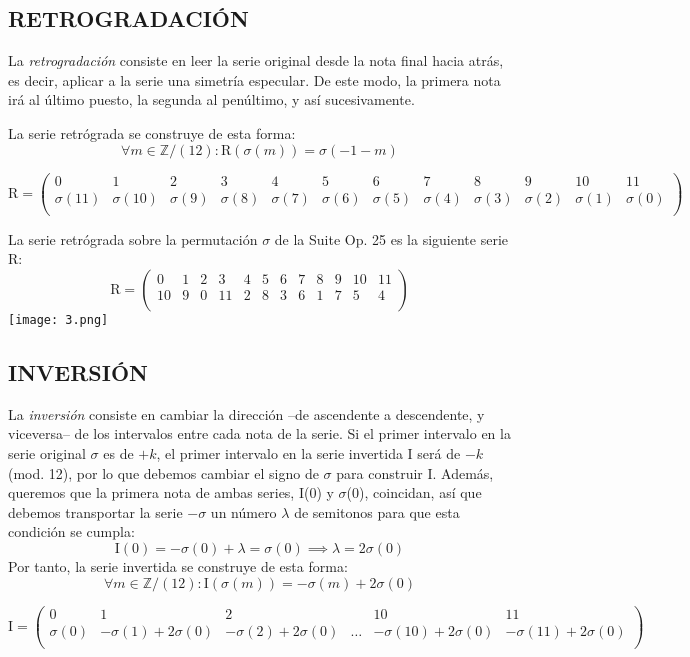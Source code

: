 	\subsection{RETROGRADACIÓN}
		La \emph{retrogradación} consiste en leer la serie original desde la nota final hacia atrás, es decir, aplicar a la serie una simetría especular. De este modo, la primera nota irá al último puesto, la segunda al penúltimo, y así sucesivamente.
		
		La serie retrógrada se construye de esta forma:
		$$
		\forall m\in \mathbb{Z} / (12):	\text{R}\left(\sigma\left(m\right)\right)=\sigma\left(-1-m\right)$$ \begin{footnotesize}$$			\text{R}=\left(\begin{matrix}0&1&2&3&4&5&6&7&8&9&10&11\\	\sigma(11)&\sigma(10)&\sigma(9)&\sigma(8)&\sigma(7)&\sigma(6)&\sigma(5)&\sigma(4)&\sigma(3)&\sigma(2)&\sigma(1)&\sigma(0)\\\end{matrix}\right)
			$$\end{footnotesize}
			
		La serie retrógrada sobre la permutación $\sigma$ de la Suite Op. 25 es la siguiente serie R:	
		$$\text{R}=\left(\begin{matrix}0&1&2&3&4&5&6&7&8&9&10&11\\10&9&0&11&2&8&3&6&1&7&5&4\\\end{matrix}\right)$$		
		\texttt{[image: 3.png]}
		
	\subsection{INVERSIÓN}
		La \emph{inversión} consiste en cambiar la dirección --de ascendente a descendente, y viceversa-- de los intervalos entre cada nota de la serie. Si el primer intervalo en la serie original $\sigma$ es de $+k$, el primer intervalo en la serie invertida I será de $-k$ (mod. 12), por lo que debemos cambiar el signo de $\sigma$ para construir I. Además, queremos que la primera nota de ambas series, I(0) y $\sigma$(0), coincidan, así que debemos transportar la serie $-\sigma$ un número $\lambda$ de semitonos para que esta condición se cumpla:
		$$\text{I}(0)=-\sigma\left(0\right)+\lambda=\sigma\left(0\right)\implies \lambda=2\sigma(0)$$
		Por tanto, la serie invertida se construye de esta forma:
		$$
		\forall m\in \mathbb{Z} / (12):	\text{I}\left(\sigma\left(m\right)\right)=-\sigma\left(m\right)+2\sigma\left(0\right)
		$$
		\begin{footnotesize}	$$
		\text{I}=\left(\begin{matrix}0&1&2&&10&11\\\sigma(0)&-\sigma(1)+2\sigma(0)&-\sigma(2)+2\sigma(0)&\ldots&-\sigma(10)+2\sigma(0)&-\sigma(11)+2\sigma(0)\\\end{matrix}\right)
		$$	\end{footnotesize}
		
